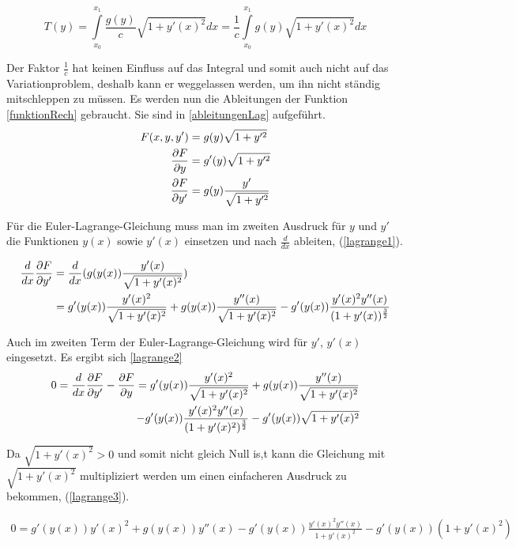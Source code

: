 \begin{equation}
	T(y) = \int \limits_{x_0}^{x_1} \frac{g(y)}{c} \sqrt{1 + y'(x)^2} dx = \frac{1}{c} \int \limits_{x_0}^{x_1} g(y) \sqrt{1 + y'(x)^2} dx
	\label{krümmung}
\end{equation}

Der Faktor $\frac{1}{c}$ hat keinen Einfluss auf das Integral und somit auch nicht auf das Variationproblem, deshalb kann er weggelassen werden, um ihn nicht ständig mitschleppen zu müssen.
Es werden nun die Ableitungen der Funktion \ref{funktionRech} gebraucht. Sie sind in \ref{ableitungenLag} aufgeführt.
\begin{align}
	F(x,y,y') &= g(y) \sqrt{1 + y'^2} \label{funktionRech} \\
	\frac{\partial F}{\partial y} &= g'(y) \sqrt{1 + y'^2} \notag \\
	\frac{\partial F}{\partial y'} &= g(y) \frac{y'}{\sqrt{1 + y'^2}}
	\label{ableitungenLag}
\end{align}

Für die Euler-Lagrange-Gleichung muss man im zweiten Ausdruck für $y$ und $y'$ die Funktionen $y(x)$ 
sowie $y'(x)$ einsetzen und nach $\frac{d}{dx}$ ableiten, (\eqref{lagrange1}).

\begin{align}
	\frac{d}{dx} \frac{\partial F}{\partial y'} &= \frac{d}{dx} (g(y(x)) \frac{y'(x)}{\sqrt{1 + y'(x)^2}}) \notag \\ 
	&= g'(y(x)) \frac{y'(x)^2}{\sqrt{1 + y'(x)^2}} + g(y(x)) \frac{y''(x)}{\sqrt{1 + y'(x)^2}}
	 - g'(y(x)) \frac{y'(x)^2 y''(x)}{(1 + y'(x))^\frac{3}{2}} 
	 \label{lagrange1}
\end{align}

Auch im zweiten Term der Euler-Lagrange-Gleichung wird für $y'$, $y'(x)$ eingesetzt. Es ergibt sich \eqref{lagrange2}
\begin{align}
	0 = \frac{d}{dx} \frac{\partial F}{\partial y'} - \frac{\partial F}{\partial y}
	= g'(y(x)) \frac{y'(x)^2}{\sqrt{1 + y'(x)^2}} + g(y(x)) \frac{y''(x)}{\sqrt{1 + y'(x)^2}} \notag \\
	- g'(y(x)) \frac{y'(x)^2 y''(x)}{(1 + y'(x)^2)^\frac{3}{2}}  - g'(y(x)) \sqrt{1 + y'(x)^2}
	\label{lagrange2}
\end{align}

Da $\sqrt{1 + y'(x)^2} > 0$ und somit nicht gleich Null is,t kann die Gleichung mit $\sqrt{1 + y'(x)^2}$  multipliziert werden um einen einfacheren Ausdruck zu bekommen, (\eqref{lagrange3}).

\begin{align}
	0 = g'(y(x)) y'(x)^2 + g(y(x)) y''(x) - g'(y(x)) \frac{y'(x)^2 y''(x)}{1 + y'(x)^2} - g'(y(x)) (1 + y'(x)^2)
	\label{lagrange3}
\end{align}

